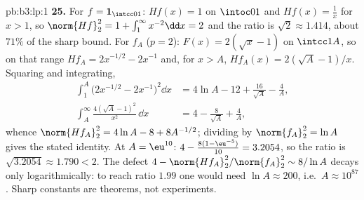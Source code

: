 \begin{solution}{pb:b3:lp:1}
\textbf{25.} For $f = \mathbf 1_{\intcc01}$: $Hf(x) = 1$ on
$\intoc01$ and $Hf(x) = \frac1x$ for $x > 1$, so
$\norm{Hf}_2^2 = 1 + \int_1^\infty x^{-2}\dd x = 2$ and the
ratio is $\sqrt2 \approx 1.414$, about $71\%$ of the sharp
bound. For $f_A$ ($p = 2$): $F(x) = 2(\sqrt x - 1)$ on
$\intcc1A$, so on that range $Hf_A = 2x^{-1/2} - 2x^{-1}$
and, for $x > A$, $Hf_A(x) = 2(\sqrt A - 1)/x$. Squaring
and integrating,
\begin{align*}
\int_1^A\bigl(2x^{-1/2} - 2x^{-1}\bigr)^2\dd x
&= 4\ln A - 12 + \frac{16}{\sqrt A} - \frac4A,\\
\int_A^{\infty}\frac{4(\sqrt A - 1)^2}{x^2}\,\dd x
&= 4 - \frac{8}{\sqrt A} + \frac4A,
\end{align*}
whence $\norm{Hf_A}_2^2 = 4\ln A - 8 + 8A^{-1/2}$; dividing
by $\norm{f_A}_2^2 = \ln A$ gives the stated identity. At $A
= \eu^{10}$: $4 - \frac{8(1 - \eu^{-5})}{10} = 3.2054$, so
the ratio is $\sqrt{3.2054} \approx 1.790 < 2$. The defect
$4 - \norm{Hf_A}_2^2/\norm{f_A}_2^2 \sim 8/\ln A$ decays
only logarithmically: to reach ratio $1.99$ one would need
$\ln A \approx 200$, i.e.\ $A \approx 10^{87}$. Sharp
constants are theorems, not experiments.
\end{solution}
